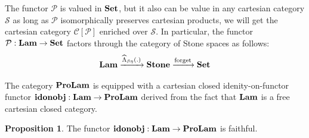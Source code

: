 \documentclass[8pt]{article}
\theoremstyle{definition}
\theoremstyle{definition}
\theoremstyle{definition}
\theoremstyle{definition}
\theoremstyle{definition}
\theoremstyle{definition}
\theoremstyle{definition}
\newtheorem{prop}{Proposition}[section]
\theoremstyle{definition}
\theoremstyle{definition}
\theoremstyle{definition}
\theoremstyle{definition}
\theoremstyle{definition}
\theoremstyle{definition}
\theoremstyle{definition}
\theoremstyle{question}
\begin{document}
The functor $\mathcal{P}$ is valued in ${\bf Set}$, but it also can be value in any cartesian category $\mathcal{S}$
as long as $\mathcal{P}$ isomorphically preserves cartesian products, we will get the cartesian category
$\mathcal{C}[\mathcal{P}]$ enriched over $\mathcal{S}$. In particular, the functor 
$\mathcal{P} : {\bf Lam} \to {\bf Set}$ factors through the category of Stone spaces as follows:
\[
{\bf Lam} \xrightarrow{\widehat{\Lambda}_{\beta \eta}(.)} {\bf Stone} \xrightarrow{\text{forget}} {\bf Set}
\]

The category ${\bf ProLam}$ is equipped with a cartesian closed idenity-on-functor functor 
${\bf idonobj} : {\bf Lam} \to {\bf ProLam}$ derived from the fact that ${\bf Lam}$ is a free cartesian closed category.
\begin{prop}
  The functor ${\bf idonobj} : {\bf Lam} \to {\bf ProLam}$ is faithful.
\end{prop}
\end{document}
